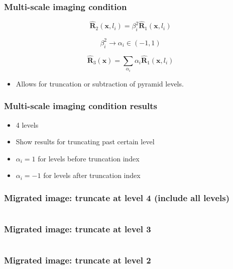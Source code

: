 \begin{frame} \frametitle{Multi-scale imaging condition}

\begin{equation}
\hat{\mathbf{R}}_2(\mathbf{x},l_i) = \beta_i^2\hat{\mathbf{R}}_1(\mathbf{x},l_i) 
\end{equation}

\pause

\begin{equation}
\beta_i^2 \rightarrow \alpha_i \in (-1,1)
\end{equation}

\pause

\begin{equation}
\hat{\mathbf{R}}_3(\mathbf{x})
=\sum_{\alpha_i} {\alpha_i \hat{{\mathbf{R}}}_1(\mathbf{x},l_i)}
\end{equation}

\begin{itemize}
\item Allows for truncation or subtraction of pyramid levels.
\end{itemize}

\end{frame}

\pause

\begin{frame} \frametitle{Multi-scale imaging condition results}
  \begin{itemize}
    \item 4 levels
    \item Show results for truncating past certain level  
    \item $\alpha_i=1$ for levels before truncation index
    \item $\alpha_i=-1$ for levels after truncation index  
  \end{itemize}
\end{frame}

\begin{frame} \frametitle{Migrated image: truncate at level 4 (include all levels)}
  \begin{columns}[t]
    \vspace{-0.15in}
  \end{columns}
\end{frame}
\begin{frame} \frametitle{Migrated image: truncate at level 3}
  \begin{columns}[t]
    \vspace{-0.15in}
  \end{columns}
\end{frame}
\begin{frame} \frametitle{Migrated image: truncate at level 2}
  \begin{columns}[t]
    \vspace{-0.15in}
  \end{columns}
\end{frame}

